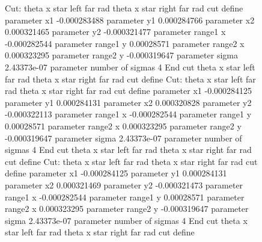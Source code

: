 \documentclass{article}
\begin{document}
\begin{landscape}
\begin{figure}[H]
	\flushleft
Cut: theta x star left far rad theta x star right far rad cut define 
parameter 	x1 -0.000283488
parameter 	y1 0.000284766
parameter 	x2 0.000321465
parameter 	y2 -0.000321477
parameter range1 x -0.000282544
parameter range1 y 0.00028571
parameter range2 x 0.000323295
parameter range2 y -0.000319647
parameter sigma 2.43373e-07
parameter number of sigmas 4
End cut theta x star left far rad theta x star right far rad cut define\newline 
Cut: theta x star left far rad theta x star right far rad cut define 
parameter 	x1 -0.000284125
parameter 	y1 0.000284131
parameter 	x2 0.000320828
parameter 	y2 -0.000322113
parameter range1 x -0.000282544
parameter range1 y 0.00028571
parameter range2 x 0.000323295
parameter range2 y -0.000319647
parameter sigma 2.43373e-07
parameter number of sigmas 4
End cut theta x star left far rad theta x star right far rad cut define\newline 
Cut: theta x star left far rad theta x star right far rad cut define 
parameter 	x1 -0.000284125
parameter 	y1 0.000284131
parameter 	x2 0.000321469
parameter 	y2 -0.000321473
parameter range1 x -0.000282544
parameter range1 y 0.00028571
parameter range2 x 0.000323295
parameter range2 y -0.000319647
parameter sigma 2.43373e-07
parameter number of sigmas 4
End cut theta x star left far rad theta x star right far rad cut define\newline 
\end{figure}
\begin{figure}[H]
	\flushleft
\end{figure}
\begin{figure}[H]
	\flushleft
\end{figure}
\begin{figure}[H]
	\flushleft
\end{figure}
\begin{figure}[H]
	\flushleft
\end{figure}
\begin{figure}[H]
	\flushleft
\end{figure}
\begin{figure}[H]
	\flushleft
\end{figure}
\begin{figure}[H]
	\flushleft
\end{figure}

\end{landscape}
\end{document}
